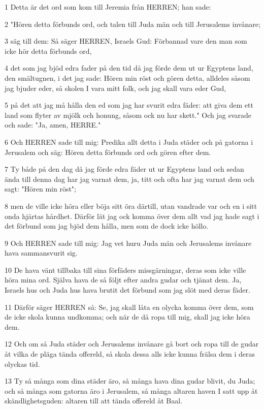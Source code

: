 \par 1 Detta är det ord som kom till Jeremia från HERREN; han sade:
\par 2 "Hören detta förbunds ord, och talen till Juda män och till Jerusalems invånare;
\par 3 säg till dem: Så säger HERREN, Israels Gud: Förbannad vare den man som icke hör detta förbunds ord,
\par 4 det som jag bjöd edra fader på den tid då jag förde dem ut ur Egyptens land, den smältugnen, i det jag sade: Hören min röst och gören detta, alldeles såsom jag bjuder eder, så skolen I vara mitt folk, och jag skall vara eder Gud,
\par 5 på det att jag må hålla den ed som jag har svurit edra fäder: att giva dem ett land som flyter av mjölk och honung, såsom ock nu har skett." Och jag svarade och sade: "Ja, amen, HERRE."
\par 6 Och HERREN sade till mig: Predika allt detta i Juda städer och på gatorna i Jerusalem och säg: Hören detta förbunds ord och gören efter dem.
\par 7 Ty både på den dag då jag förde edra fäder ut ur Egyptens land och sedan ända till denna dag har jag varnat dem, ja, titt och ofta har jag varnat dem och sagt: "Hören min röst";
\par 8 men de ville icke höra eller böja sitt öra därtill, utan vandrade var och en i sitt onda hjärtas hårdhet. Därför lät jag ock komma över dem allt vad jag hade sagt i det förbund som jag bjöd dem hålla, men som de dock icke höllo.
\par 9 Och HERREN sade till mig: Jag vet huru Juda män och Jerusalems invånare hava sammansvurit sig.
\par 10 De hava vänt tillbaka till sina förfäders missgärningar, deras som icke ville höra mina ord. Själva hava de så följt efter andra gudar och tjänat dem. Ja, Israels hus och Juda hus hava brutit det förbund som jag slöt med deras fäder.
\par 11 Därför säger HERREN så: Se, jag skall låta en olycka komma över dem, som de icke skola kunna undkomma; och när de då ropa till mig, skall jag icke höra dem.
\par 12 Och om så Juda städer och Jerusalems invånare gå bort och ropa till de gudar åt vilka de pläga tända offereld, så skola dessa alls icke kunna frälsa dem i deras olyckas tid.
\par 13 Ty så många som dina städer äro, så många hava dina gudar blivit, du Juda; och så många som gatorna äro i Jerusalem, så många altaren haven I satt upp åt skändlighetsguden: altaren till att tända offereld åt Baal.
